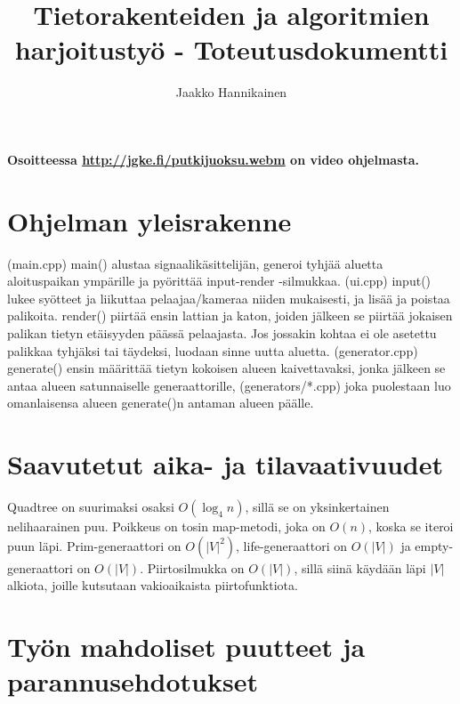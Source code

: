 \documentclass{article}
\author{Jaakko Hannikainen}
\title{Tietorakenteiden ja algoritmien harjoitustyö - Toteutusdokumentti}
\begin{document}
\maketitle

\textbf{Osoitteessa \url{http://jgke.fi/putkijuoksu.webm} on video ohjelmasta.}

\section{Ohjelman yleisrakenne}
(main.cpp) main() alustaa signaalikäsittelijän, generoi tyhjää aluetta
aloituspaikan ympärille ja pyörittää input-render -silmukkaa. (ui.cpp) input()
lukee syötteet ja liikuttaa pelaajaa/kameraa niiden mukaisesti, ja lisää ja
poistaa palikoita. render() piirtää ensin lattian ja katon, joiden jälkeen se
piirtää jokaisen palikan tietyn etäisyyden päässä pelaajasta. Jos jossakin
kohtaa ei ole asetettu palikkaa tyhjäksi tai täydeksi, luodaan sinne uutta
aluetta. (generator.cpp) generate() ensin määrittää tietyn kokoisen alueen
kaivettavaksi, jonka jälkeen se antaa alueen satunnaiselle generaattorille,
(generators/*.cpp) joka puolestaan luo omanlaisensa alueen generate()n antaman
alueen päälle.

\section{Saavutetut aika- ja tilavaativuudet}
Quadtree on suurimaksi osaksi $O(\log_4 n)$, sillä se on yksinkertainen
nelihaarainen puu. Poikkeus on tosin map-metodi, joka on $O(n)$, koska se iteroi
puun läpi. Prim-generaattori on $O(|V|^2)$, life-generaattori on $O(|V|)$ ja
empty-generaattori on $O(|V|)$. Piirtosilmukka on $O(|V|)$, sillä siinä
käydään läpi $|V|$ alkiota, joille kutsutaan vakioaikaista piirtofunktiota.

\section{Työn mahdoliset puutteet ja parannusehdotukset}
\end{document}
